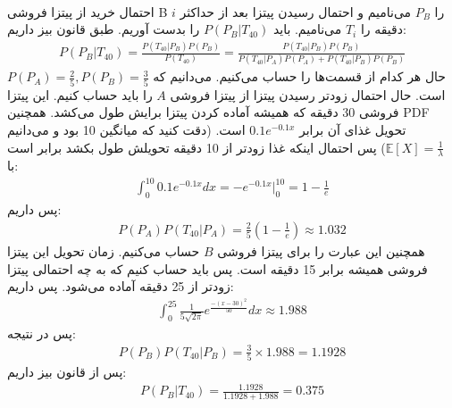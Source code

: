 \\
احتمال خرید از پیتزا فروشی B را
$P_B$
می‌نامیم و احتمال رسیدن پیتزا بعد از حداکثر
$i$
دقیقه را
$T_i$
می‌نامیم.
باید
$P(P_B|T_{40})$
را بدست آوریم.
طبق قانون بیز داریم:
\begin{gather*}
    P(P_B|T_{40}) = \frac{P(T_{40}|P_B) P(P_B)}{P(T_{40})} = \frac{P(T_{40}|P_B) P(P_B)}{P(T_{40}|P_A) P(P_A) + P(T_{40}|P_B) P(P_B)}
\end{gather*}
حال هر کدام از قسمت‌ها را حساب می‌کنیم. می‌دانیم که
$P(P_A) = \frac{2}{5}, P(P_B) = \frac{3}{5}$
است. حال احتمال زودتر رسیدن پیتزا از پیتزا فروشی
$A$
را باید حساب کنیم. این پیتزا فروشی 30 دقیقه که همیشه آماده کردن پیتزا برایش طول می‌کشد. همچنین
PDF
تحویل غذای آن برابر
$0.1e^{-0.1x}$
است.
(دقت کنید که میانگین 10 بود و می‌دانیم
$\mathbb{E} [X] = \frac{1}{\lambda}$)
پس احتمال اینکه غذا زودتر از 10 دقیقه تحویلش طول بکشد برابر است با:
\begin{gather*}
    \int_0^{10} 0.1e^{-0.1x} dx = -e^{-0.1x} \big |_0^{10} = 1 - \frac{1}{e}
\end{gather*}
پس داریم:
\begin{gather*}
    P(P_A) P(T_{40}|P_A) = \frac{2}{5} (1 - \frac{1}{e}) \approx 1.032
\end{gather*}
همچنین این عبارت را برای پیتزا فروشی
$B$
حساب می‌کنیم. زمان تحویل این پیتزا فروشی همیشه برابر 15 دقیقه است. پس باید حساب کنیم که به چه احتمالی
پیتزا زودتر از 25 دقیقه آماده می‌شود. پس داریم:
\begin{gather*}
    \int_0^{25} \frac{1}{5\sqrt{2\pi}}e^{\frac{-(x-30)^2}{50}} dx \approx 1.988
\end{gather*}
پس در نتیجه:
\begin{gather*}
    P(P_B) P(T_{40}|P_B) = \frac{3}{5} \times 1.988 = 1.1928
\end{gather*}
پس از قانون بیز داریم:
\begin{gather*}
    P(P_B|T_{40}) = \frac{1.1928}{1.1928 + 1.988} = 0.375
\end{gather*}

